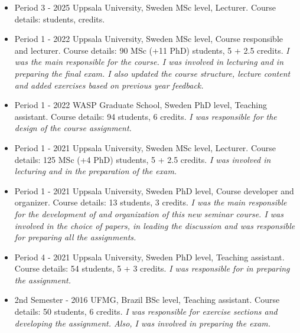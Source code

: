 \documentclass[10pt,A4]{article} %
\begin{document}
 \begin{itemize}

    \item {}
    {   Period 3 - 2025  }
    { Uppsala University, Sweden }
    {  MSc level, Lecturer. Course details:  students,  credits.  \emph{  } }
    
    \item {}
    {   Period 1 - 2022  }
    { Uppsala University, Sweden }
    {  MSc level, Course responsible and lecturer. Course details: 90 MSc (+11 PhD) students, 5 + 2.5 credits.  \emph{ I was the main responsible for the course. I was involved in lecturing and in preparing the final exam. I also updated the course structure, lecture content and added exercises based on previous year feedback. } }
    
    \item {}
    {   Period 1 - 2022  }
    { WASP Graduate School, Sweden }
    {  PhD level, Teaching assistant. Course details: 94 students, 6 credits.  \emph{ I was responsible for the design of the course assignment. } }
    
    \item {}
    {   Period 1 - 2021  }
    { Uppsala University, Sweden }
    {  MSc level, Lecturer. Course details: 125 MSc (+4 PhD) students, 5 + 2.5 credits.  \emph{ I was involved in lecturing and in the preparation of the exam. } }
    
    \item {}
    {   Period 1 - 2021  }
    { Uppsala University, Sweden }
    {  PhD level, Course developer and organizer. Course details: 13 students, 3 credits.  \emph{ I was the main responsible for the development of and organization of this new seminar course. I was involved in the choice of papers, in leading the discussion and was responsible for preparing all the assignments. } }
    
    \item {}
    {   Period 4 - 2021  }
    { Uppsala University, Sweden }
    {  PhD level, Teaching assistant. Course details: 54 students, 5 + 3 credits.  \emph{ I was responsible for in preparing the assignment. } }
    
    \item {}
    {   2nd Semester - 2016  }
    { UFMG, Brazil }
    {  BSc level, Teaching assistant. Course details: 50 students, 6 credits.  \emph{ I was responsible for exercise sections and developing the assignment. Also, I was involved in preparing the exam. } }
    

\end{itemize}
\end{document}
